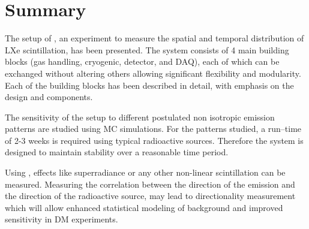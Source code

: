 \section{Summary}
\label{sec:summary}

The setup of \direxeno, an experiment to measure the spatial and temporal distribution of LXe scintillation, has 
been presented. The system consists of 4 main building blocks (gas handling, cryogenic, detector, 
and DAQ), each of which can be exchanged without altering others allowing significant flexibility 
and modularity. Each of the building blocks has been described in detail, with emphasis on the design 
and components.

The sensitivity of the setup to different postulated non isotropic emission patterns are studied using MC simulations. For the patterns studied, a run--time of 2-3 weeks is required using typical radioactive 
sources. Therefore the system is designed to maintain stability over a reasonable time period.

Using \direxeno, effects like superradiance or any other non-linear scintillation can be measured. 
Measuring the correlation between the direction of the emission and the direction of the radioactive 
source, may lead to directionality measurement which will allow enhanced statistical modeling of 
background and improved sensitivity in DM experiments.
